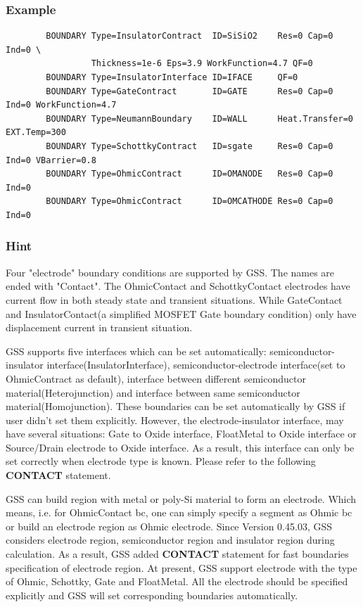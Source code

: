 \documentclass[11pt,pdftex]{article}
\begin{document}
\subsubsection*{Example}
\begin{verbatim}
        BOUNDARY Type=InsulatorContract  ID=SiSiO2    Res=0 Cap=0 Ind=0 \
                 Thickness=1e-6 Eps=3.9 WorkFunction=4.7 QF=0
        BOUNDARY Type=InsulatorInterface ID=IFACE     QF=0
        BOUNDARY Type=GateContract       ID=GATE      Res=0 Cap=0 Ind=0 WorkFunction=4.7
        BOUNDARY Type=NeumannBoundary    ID=WALL      Heat.Transfer=0 EXT.Temp=300
        BOUNDARY Type=SchottkyContract   ID=sgate     Res=0 Cap=0 Ind=0 VBarrier=0.8
        BOUNDARY Type=OhmicContract      ID=OMANODE   Res=0 Cap=0 Ind=0
        BOUNDARY Type=OhmicContract      ID=OMCATHODE Res=0 Cap=0 Ind=0
\end{verbatim}

\subsubsection*{Hint}
Four "electrode" boundary conditions are supported by GSS. The names
are ended with "Contact". The OhmicContact and SchottkyContact
electrodes have current flow in both steady state and transient
situations. While GateContact and InsulatorContact(a simplified
MOSFET Gate boundary condition) only have displacement current in
transient situation.

GSS supports five interfaces which can be set automatically:
semiconductor-insulator interface(InsulatorInterface),
semiconductor-electrode interface(set to OhmicContract as default),
interface between different semiconductor material(Heterojunction)
and  interface between same semiconductor material(Homojunction).
These boundaries can be set automatically by GSS if user didn't set
them explicitly. However, the electrode-insulator interface, may
have several situations: Gate to Oxide interface, FloatMetal to
Oxide interface or Source/Drain electrode to Oxide interface. As a
result, this interface can only be set correctly when electrode type
is known. Please refer to the following \textbf{CONTACT} statement.

GSS can build region with metal or poly-Si material to form an
electrode. Which means, i.e. for OhmicContact bc, one can simply
specify a segment as Ohmic bc or build an electrode region as Ohmic
electrode. Since Version 0.45.03, GSS considers electrode region,
semiconductor region and insulator region during calculation. As a
result, GSS added \textbf{CONTACT} statement for fast boundaries
specification of electrode region. At present, GSS support electrode
with the type of Ohmic, Schottky, Gate and FloatMetal. All the
electrode should be specified explicitly and GSS will set
corresponding boundaries automatically.
\end{document}
